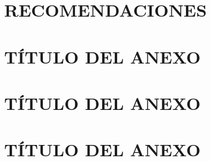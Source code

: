 \documentclass[letterpaper,titlepage,12pt,oneside,spanish,final]{report_eie}
\begin{document}
\chapter{RECOMENDACIONES}\label{CAP:recomendaciones}
%

\appendix

\renewcommand \thechapter{\Roman{chapter}}
\chapter{TÍTULO DEL ANEXO}\label{CAP:anexo0}

\chapter{TÍTULO DEL ANEXO}\label{CAP:anexo1}

\chapter{TÍTULO DEL ANEXO}\label{CAP:anexo2}




\newpage

%
\renewcommand{\bibname}{REFERENCIAS}
\let\oldbibsection\bibsection




\printindex%
\end{document}
